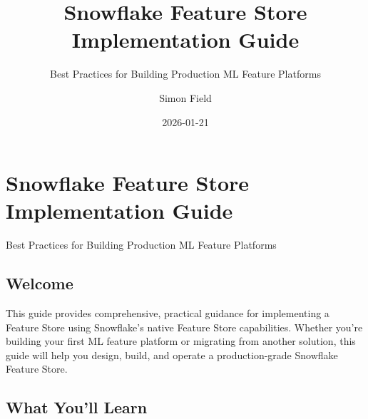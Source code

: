 \documentclass[
  letterpaper,
  DIV=11,
  numbers=noendperiod]{scrreprt}
\title{Snowflake Feature Store Implementation Guide}
\subtitle{Best Practices for Building Production ML Feature Platforms}
\author{Simon Field}
\date{2026-01-21}
\renewcommand*\contentsname{Table of contents}
\newcommand\contentsname{Table of contents}
\begin{document}
\maketitle
\ifdefined\Shaded\renewenvironment{Shaded}{\begin{tcolorbox}[interior hidden, enhanced, sharp corners, borderline west={3pt}{0pt}{shadecolor}, boxrule=0pt, breakable, frame hidden]}{\end{tcolorbox}}\fi

\renewcommand*\contentsname{Table of contents}
{
\hypersetup{linkcolor=}
\setcounter{tocdepth}{2}
\tableofcontents
}

\hypertarget{snowflake-feature-store-implementation-guide}{%
\chapter{Snowflake Feature Store Implementation
Guide}\label{snowflake-feature-store-implementation-guide}}

Best Practices for Building Production ML Feature Platforms

\hfill\break

\hypertarget{welcome}{%
\section*{Welcome}\label{welcome}}


This guide provides comprehensive, practical guidance for implementing a
Feature Store using Snowflake's native Feature Store capabilities.
Whether you're building your first ML feature platform or migrating from
another solution, this guide will help you design, build, and operate a
production-grade Snowflake Feature Store.

\hypertarget{what-youll-learn}{%
\section*{What You'll Learn}\label{what-youll-learn}}

\end{document}
